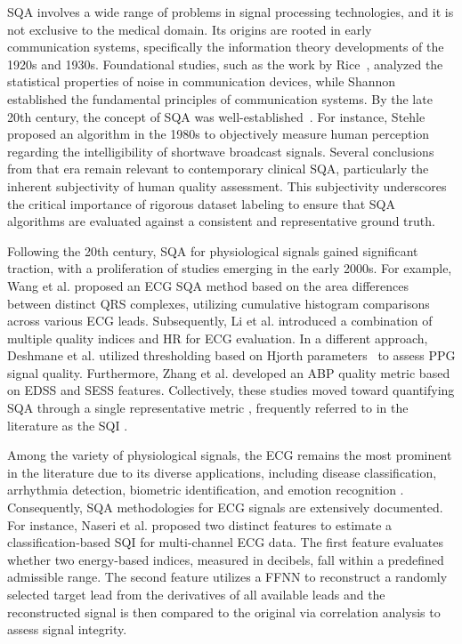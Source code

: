 \documentclass[final,3p,times,twocolumn]{elsarticle}
\begin{document}
\gls{SQA} involves a wide range of problems in signal processing technologies, and it is not exclusive to the medical domain.
Its origins are rooted in early communication systems, specifically the information theory developments of the 1920s and 1930s.
Foundational studies, such as the work by Rice~\cite{origins-1}, analyzed the statistical properties of noise in communication devices, while Shannon~\cite{origins-2} established the fundamental principles of communication systems.
By the late 20th century, the concept of \gls{SQA} was well-established~\cite{origins-3, origins-4}.
For instance, Stehle~\cite{origins-3} proposed an algorithm in the 1980s to objectively measure human perception regarding the intelligibility of shortwave broadcast signals.
Several conclusions from that era remain relevant to contemporary clinical \gls{SQA}, particularly the inherent subjectivity of human quality assessment.
This subjectivity underscores the critical importance of rigorous dataset labeling to ensure that \gls{SQA} algorithms are evaluated against a consistent and representative ground truth.

Following the 20th century, \gls{SQA} for physiological signals gained significant traction, with a proliferation of studies emerging in the early 2000s. 
For example, Wang et al. \cite{2000s-1} proposed an \gls{ECG} \gls{SQA} method based on the area differences between distinct QRS complexes, utilizing cumulative histogram comparisons across various \gls{ECG} leads.
Subsequently, Li et al. \cite{2000s-2} introduced a combination of multiple quality indices and \gls{HR} for \gls{ECG} evaluation.
In a different approach, Deshmane et al. \cite{2000s-3} utilized thresholding based on Hjorth parameters~\cite{hjorth-parameters} to assess \gls{PPG} signal quality. Furthermore, Zhang et al. \cite{2000s-4} developed an \gls{ABP} quality metric based on \gls{EDSS} and \gls{SESS} features.
Collectively, these studies moved toward quantifying \gls{SQA} through a single representative metric \cite{2000s-2, 2000s-3, 2000s-4}, frequently referred to in the literature as the \gls{SQI} \cite{2000s-2, 2000s-3}.


Among the variety of physiological signals, the \gls{ECG} remains the most prominent in the literature due to its diverse applications, including disease classification, arrhythmia detection, biometric identification, and emotion recognition \cite{ecg-1}.
Consequently, \gls{SQA} methodologies for \gls{ECG} signals are extensively documented.
For instance, Naseri et al. \cite{ecg-2} proposed two distinct features to estimate a classification-based \gls{SQI} for multi-channel \gls{ECG} data.
The first feature evaluates whether two energy-based indices, measured in decibels, fall within a predefined admissible range.
The second feature utilizes a \gls{FFNN} to reconstruct a randomly selected target lead from the derivatives of all available leads and the reconstructed signal is then compared to the original via correlation analysis to assess signal integrity.
\end{document}
